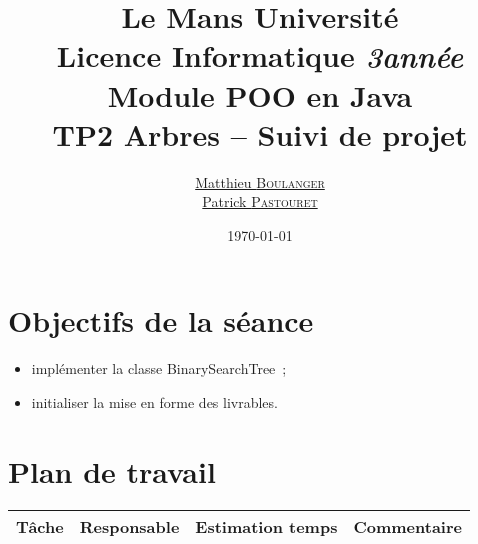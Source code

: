 \documentclass[a4paper,11pt]{article}
\title {\textbf {\color {blue} Le Mans Université}\color{black}
\\  Licence Informatique  \textit {3\ieme année}
 \\Module POO en Java
 \\ \textbf {TP2 Arbres – Suivi de projet}}
\author{\href{mailto: matthieu.boulanger.etu@univ-lemans.fr} {Matthieu \textsc{Boulanger}}\\
      \href{mailto: patrick.pastouret.etu@univ-lemans.fr} {Patrick \textsc{Pastouret}}}
\date{\today}
\begin{document}
\maketitle

\section{Objectifs de la séance}
\begin{itemize}
    \item implémenter la classe BinarySearchTree~;
    \item initialiser la mise en forme des livrables.
\end{itemize}

\section{Plan de travail}
\begin{center}
    \begin{tabular}{p{.3\linewidth}ccp{.3\linewidth}}
      \toprule
	Tâche & Responsable & Estimation temps & Commentaire \\
      \midrule
      \bottomrule
   \end{tabular}
\end{center}
\end{document}
